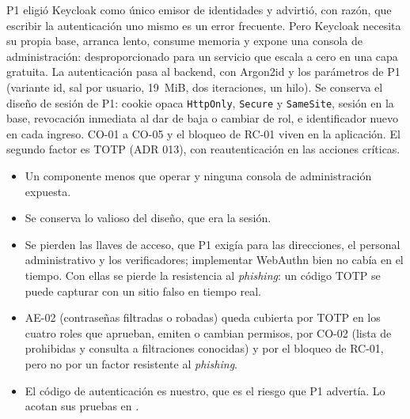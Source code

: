 \documentclass[11pt,a4paper]{article}
\theoremstyle{definition}
\theoremstyle{remark}
\newcommand{\code}[1]{\texttt{#1}}
\begin{document}
\adrctx P1 eligió Keycloak como único emisor de identidades y advirtió, con
razón, que escribir la autenticación uno mismo es un error frecuente. Pero
Keycloak necesita su propia base, arranca lento, consume memoria y expone una
consola de administración: desproporcionado para un servicio que escala a
cero en una capa gratuita.
\adrdec La autenticación pasa al backend, con Argon2id y los parámetros de
P1 (variante id, sal por usuario, 19~MiB, dos iteraciones, un hilo). Se
conserva el diseño de sesión de P1: cookie opaca \code{HttpOnly},
\code{Secure} y \code{SameSite}, sesión en la base, revocación inmediata al
dar de baja o cambiar de rol, e identificador nuevo en cada ingreso. CO-01 a
CO-05 y el bloqueo de RC-01 viven en la aplicación. El segundo factor es TOTP
(ADR 013), con reautenticación en las acciones críticas.
\adrpos
\begin{itemize}
  \item Un componente menos que operar y ninguna consola de administración
    expuesta.
  \item Se conserva lo valioso del diseño, que era la sesión.
\end{itemize}
\adrneg
\begin{itemize}
  \item Se pierden las llaves de acceso, que P1 exigía para las direcciones,
    el personal administrativo y los verificadores; implementar WebAuthn bien
    no cabía en el tiempo. Con ellas se pierde la resistencia al
    \emph{phishing}: un código TOTP se puede capturar con un sitio falso en
    tiempo real.
  \item AE-02 (contraseñas filtradas o robadas) queda cubierta por TOTP en los
    cuatro roles que aprueban, emiten o cambian permisos, por CO-02 (lista de
    prohibidas y consulta a filtraciones conocidas) y por el bloqueo de RC-01,
    pero no por un factor resistente al \emph{phishing}.
  \item El código de autenticación es nuestro, que es el riesgo que P1
    advertía. Lo acotan sus pruebas en .
\end{itemize}
\end{document}
